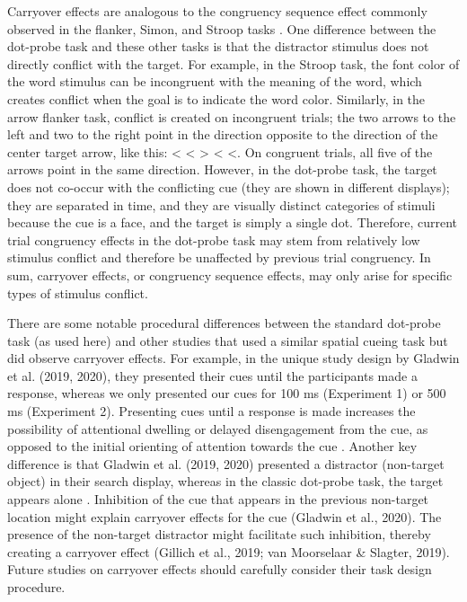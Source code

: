 \documentclass{article}
\begin{document}
	Carryover effects are analogous to the congruency sequence effect commonly observed in the flanker, Simon, and Stroop tasks \textcite{[object Object]}. One difference between the dot-probe task and these other tasks is that the distractor stimulus does not directly conflict with the target. For example, in the Stroop task, the font color of the word stimulus can be incongruent with the meaning of the word, which creates conflict when the goal is to indicate the word color. Similarly, in the arrow flanker task, c{\color{4472C4}onflict is created on incongruent trials; the two arrows to the left and two to the right point in the direction opposite to the direction of the center target arrow, like this: < < > < <. On congruent trials, all five of the arrows point in the same direction. }{\color{4472C4}However, in the dot-probe task, the target does not co-occur with the conflicting cue (they are shown in different displays); they are separated in time, and they are visually distinct categories of stimuli because the cue is a face, and the target is simply a single dot. }Therefore, current trial congruency effects in the dot-probe task may stem from relatively low stimulus conflict and therefore be unaffected by previous trial congruency. In sum, carryover effects, or congruency sequence effects, may only arise for specific types of stimulus conflict.



	There are some notable procedural differences between the standard dot-probe task (as used here) and other studies that used a similar spatial cueing task but did observe carryover effects. For example, in the unique study design by \textcite{Gladwin2019b, Gladwin2020a}Gladwin et al. (2019, 2020), they presented their cues until the participants made a response, whereas we only presented our cues for 100 ms (Experiment 1) or 500 ms (Experiment 2). Presenting cues until a response is made increases the possibility of attentional dwelling or delayed disengagement from the cue, as opposed to the initial orienting of attention towards the cue \textcite{[object Object]}. Another key difference is that \textcite{Gladwin2019b, Gladwin2020a}Gladwin et al. (2019, 2020) presented a distractor (non-target object) in their search display, whereas in the classic dot-probe task, the target appears alone \textcite{[object Object]}. Inhibition of the cue that appears in the previous non-target location might explain carryover effects for the cue \parencites{Gladwin2020a}(Gladwin et al., 2020). The presence of the non-target distractor might facilitate such inhibition, thereby creating a carryover effect \parencites{Gillich2019}{Moorselaar2019}(Gillich et al., 2019; van Moorselaar \& Slagter, 2019). Future studies on carryover effects should carefully consider their task design procedure.
\end{document}
